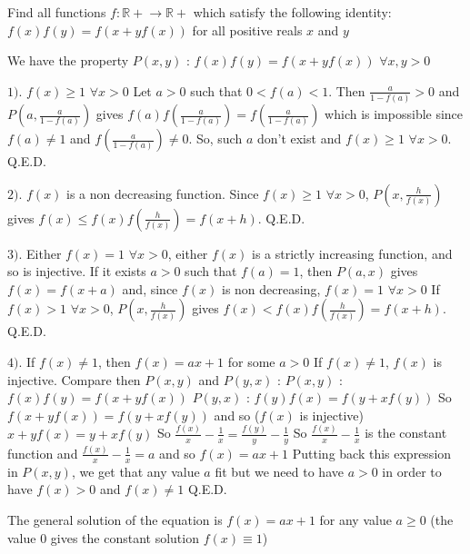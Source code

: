 \begin{mysolution}
	\begin{tcolorbox}Find all functions $ f: \mathbb{R+}\to\mathbb{R+}$   which satisfy the following identity:
$ f(x)f(y)=f(x+yf(x))$ for all positive reals $ x$ and $ y$\end{tcolorbox}

We have the property $ P(x,y)$ : $ f(x)f(y)=f(x+yf(x))$ $ \forall x,y>0$

$ 1).$ $ f(x)\geq 1$ $ \forall x>0$
Let $ a>0$ such that $ 0<f(a)<1$. Then $ \frac{a}{1-f(a)}>0$ and $ P(a,\frac{a}{1-f(a)})$ gives $ f(a)f(\frac{a}{1-f(a)})=f(\frac{a}{1-f(a)})$ which is impossible since $ f(a)\neq 1$ and $ f(\frac{a}{1-f(a)})\neq 0$. So, such $ a$ don't exist and $ f(x)\geq 1$ $ \forall x>0$. 
Q.E.D.

$ 2).$ $ f(x)$ is a non decreasing function.
Since $ f(x)\geq 1$ $ \forall x>0$, $ P(x,\frac{h}{f(x)})$ gives $ f(x)\leq f(x)f(\frac{h}{f(x)})=f(x+h)$.
Q.E.D.

$ 3).$ Either $ f(x)=1$ $ \forall x>0$, either $ f(x)$ is a strictly increasing function, and so is injective.
If it exists $ a>0$ such that $ f(a)=1$, then $ P(a,x)$ gives $ f(x)=f(x+a)$ and, since $ f(x)$ is non decreasing, $ f(x)=1$ $ \forall x>0$
If $ f(x)>1$ $ \forall x>0$, $ P(x,\frac{h}{f(x)})$ gives $ f(x)< f(x)f(\frac{h}{f(x)})=f(x+h)$.
Q.E.D.

$ 4).$ If $ f(x)\neq 1$, then $ f(x)=ax+1$ for some $ a>0$
If $ f(x)\neq 1$, $ f(x)$ is injective. Compare then $ P(x,y)$ and $ P(y,x)$ :
$ P(x,y)$ : $ f(x)f(y)=f(x+yf(x))$ 
$ P(y,x)$ : $ f(y)f(x)=f(y+xf(y))$ 
So $ f(x+yf(x))=f(y+xf(y))$ and so ($ f(x)$ is injective) $ x+yf(x)=y+xf(y)$
So $ \frac{f(x)}{x}-\frac{1}{x}=\frac{f(y)}{y}-\frac{1}{y}$
So $ \frac{f(x)}{x}-\frac{1}{x}$ is the constant function and $ \frac{f(x)}{x}-\frac{1}{x}=a$ and so $ f(x)=ax+1$
Putting back this expression in $ P(x,y)$, we get that any value $ a$ fit but we need to have $ a>0$ in order to have $ f(x)>0$ and $ f(x)\neq 1$
Q.E.D.

The general solution of the equation is $ f(x)=ax+1$ for any value $ a\geq 0$ (the value 0 gives the constant solution $ f(x)\equiv 1$)
\end{mysolution}



